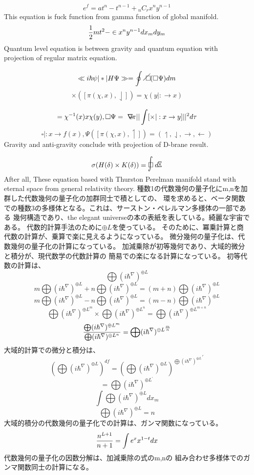 \documentclass{jsarticle}
\begin{document}
  $$ e^{f} = at^n - t^{n-1} + {}_n C_{r}x^n y^{n-1} $$
  This equation is fuck function from gamma function of global manifold.
  $$ {{1 \over 2}mt^2} - \in x^n y^{n-1}dx_mdy_m $$
  Quantum level equation is between gravity and quantum equation with
  projection of regular matrix equation.
  $$ \ll i\hbar \psi |\ast| H \Psi\gg = \oint \alearletter(\square \Psi)dm $$
  $$ \times([\pi(\chi,x),\downharpoonleft]) = \chi(y|:\to x) $$
  $$ = \chi^{-1}(x)x\chi(y), \square \Psi = \secproduct \pi||\int[\times|:
  x \to y]||^2d\tau $$
  $$ \square |:x \to f(x), \Psi([\pi(\chi,x),\upharpoonleft])
  = (\upharpoonleft,\downharpoonleft,\rightarrow,\leftarrow) $$
  Gravity and anti-gravity conclude with projection of D-brane result.
  $$ \sigma(H(\delta) \times K(\delta)) = \flowerletter d\timebow $$
  After all, These equation based with Thurston Perelman manifold
  stand with eternal space from general relativity theory.
種数1の代数幾何の量子化にm,nを加群した代数幾何の量子化の加群同士で積としての、 環を求めると、ベータ関数での種数3の多様体となる。これは、サーストン・ペレルマン多様体の一部である 幾何構造であり、the elegant universeの本の表紙を表している。綺麗な宇宙である。 代数的計算手法のために$ \oplus L $を使っている。 そのために、冪乗計算と商代数の計算が、乗算で楽に見えるようになっている。 微分幾何の量子化は、代数幾何の量子化の計算になっている。 加減乗除が初等幾何であり、大域的微分と積分が、現代数学の代数計算の 簡易での楽になる計算になっている。 初等代数の計算は、 $$ \bigoplus({i \hbar^{\nabla}})^{\oplus L} $$ $$m \bigoplus({i \hbar^{\nabla}})^{\oplus L} +  
   n\bigoplus({i \hbar^{\nabla}})^{\oplus L} = 
   (m+n) \bigoplus({i \hbar^{\nabla}})^{\oplus L}   $$
   $$ m\bigoplus({i \hbar^{\nabla}})^{\oplus L} -  
   n\bigoplus({i \hbar^{\nabla}})^{\oplus L} = 
   (m-n) \bigoplus({i \hbar^{\nabla}})^{\oplus L}   $$
   $$ \bigoplus({i \hbar^{\nabla}})^{{\oplus L}^m} \times 
      \bigoplus({i \hbar^{\nabla}})^{{\oplus L}^n} =
   \bigoplus({i \hbar^{\nabla}})^{\oplus L^{m+n}} $$
  $$ {{\bigoplus({i \hbar^{\nabla}})^{\oplus L^m}}  \over  
  {\bigoplus({i \hbar^{\nabla}})^{\oplus L^n}}} =  
  \bigoplus({i \hbar^{\nabla}})^{\oplus L^{m\over n}} $$
  大域的計算での微分と積分は、
  $$ \left(\bigoplus({i \hbar^{\nabla}})^{\oplus L}\right)^{df}
  =  {\left(\bigoplus({i \hbar^{\nabla}})^{\oplus L}\right)^{
	  \bigoplus({i \hbar^{\nabla}})^{\oplus L}}}^{'}  $$
  $$ = \bigoplus({i \hbar^{\nabla}})^{\oplus L^{'}} $$
   $$ \int \bigoplus({i \hbar^{\nabla}})^{\oplus L} dx_m $$
   $$ \bigoplus({i \hbar^{\nabla}})^{\oplus L} = n $$
   大域的積分の代数幾何の量子化での計算は、ガンマ関数になっている。
   $$ {n^{L+1} \over {n+1}} = \int e^x x^{1 - t} dx $$
   代数幾何の量子化の因数分解は、加減乗除の式のm,nの
   組み合わせ多様体でのガンマ関数同士の計算になる。
\end{document}
